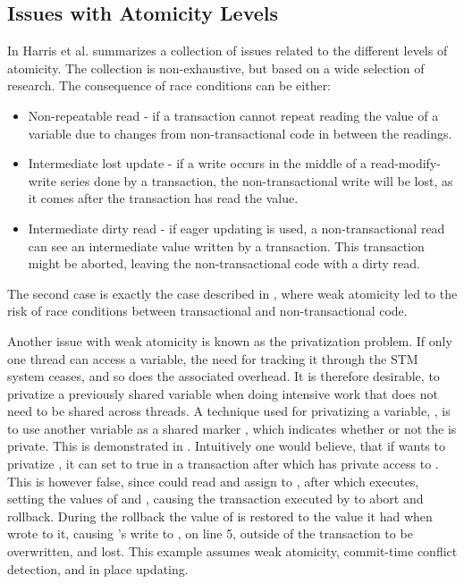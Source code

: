 \subsection{Issues with Atomicity Levels}
In \cite[p. 30-35]{harris2010transactional} Harris et al. summarizes a collection of issues related to the different levels of atomicity. The collection is non-exhaustive, but based on a wide selection of research. The consequence of race conditions can be either:
\begin{itemize}
	\item Non-repeatable read - if a transaction cannot repeat reading the value of a variable due to changes from non-transactional code in between the readings.
	\item Intermediate lost update - if a write occurs in the middle of a read-modify-write series done by a transaction, the non-transactional write will be lost, as it comes after the transaction has read the value.
	\item Intermediate dirty read - if eager updating\cite[p. 53]{dpt907e14trending} is used, a non-transactional read can see an intermediate value written by a transaction. This transaction might be aborted, leaving the non-transactional code with a dirty read.
\end{itemize}
The second case is exactly the case described in , where weak atomicity led to the risk of race conditions between transactional and non-transactional code.

Another issue with weak atomicity is known as the privatization problem. If only one thread can access a variable, the need for tracking it through the \ac{STM} system ceases, and so does the associated overhead. It is therefore desirable, to privatize a previously shared variable when doing intensive work that does not need to be shared across threads. A technique used for privatizing a variable, , is to use another variable as a shared marker , which indicates whether or not the  is private. This is demonstrated in . Intuitively one would believe, that if  wants to privatize , it can set  to true in a transaction after which  has private access to . This is however false, since  could read  and assign to , after which  executes, setting the values of  and , causing the transaction executed by  to abort and rollback. During the rollback the value of  is restored to the value it had when  wrote to it, causing 's write to , on line 5, outside of the transaction to be overwritten, and lost. This example assumes weak atomicity, commit-time conflict detection, and in place updating\cite[p. 34]{harris2010transactional}.

